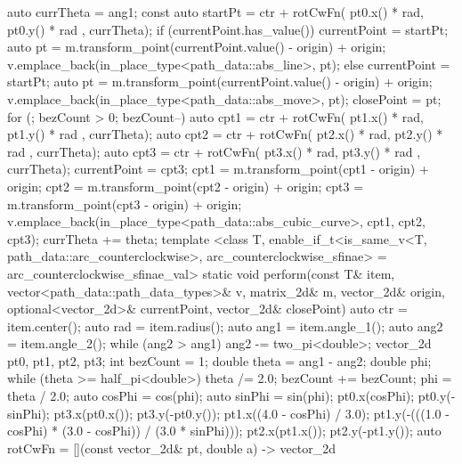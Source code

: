 \begin{codeblock}
{{{{          auto currTheta = ang1;
          const auto startPt =
            ctr + rotCwFn({ pt0.x() * rad, pt0.y() * rad }, currTheta);
          if (currentPoint.has_value()) {
            currentPoint = startPt;
            auto pt = m.transform_point(currentPoint.value() - origin) + origin;
            v.emplace_back(in_place_type<path_data::abs_line>, pt);
          }
          else {
            currentPoint = startPt;
            auto pt = m.transform_point(currentPoint.value() - origin) + origin;
            v.emplace_back(in_place_type<path_data::abs_move>, pt);
            closePoint = pt;
          }
          for (; bezCount > 0; bezCount--) {
            auto cpt1 = ctr + rotCwFn({ pt1.x() * rad, pt1.y() * rad }, 
            currTheta);
            auto cpt2 = ctr + rotCwFn({ pt2.x() * rad, pt2.y() * rad },
              currTheta);
            auto cpt3 = ctr + rotCwFn({ pt3.x() * rad, pt3.y() * rad },
              currTheta);
            currentPoint = cpt3;
            cpt1 = m.transform_point(cpt1 - origin) + origin;
            cpt2 = m.transform_point(cpt2 - origin) + origin;
            cpt3 = m.transform_point(cpt3 - origin) + origin;
            v.emplace_back(in_place_type<path_data::abs_cubic_curve>, cpt1,
              cpt2, cpt3);
            currTheta += theta;
          }
        }
      }
      template <class T, enable_if_t<is_same_v<T, 
        path_data::arc_counterclockwise>, arc_counterclockwise_sfinae> = 
        arc_counterclockwise_sfinae_val>
      static void perform(const T& item, vector<path_data::path_data_types>& v, 
        matrix_2d& m, vector_2d& origin, optional<vector_2d>& currentPoint, 
        vector_2d& closePoint) {
        {
          auto ctr = item.center();
          auto rad = item.radius();
          auto ang1 = item.angle_1();
          auto ang2 = item.angle_2();
          while (ang2 > ang1) {
            ang2 -= two_pi<double>;
          }
          vector_2d pt0, pt1, pt2, pt3;
          int bezCount = 1;
          double theta = ang1 - ang2;
          double phi{};
          while (theta >= half_pi<double>) {
            theta /= 2.0;
            bezCount += bezCount;
          }
          phi = theta / 2.0;
          auto cosPhi = cos(phi);
          auto sinPhi = sin(phi);
          pt0.x(cosPhi);
          pt0.y(-sinPhi);
          pt3.x(pt0.x());
          pt3.y(-pt0.y());
          pt1.x((4.0 - cosPhi) / 3.0);
          pt1.y(-(((1.0 - cosPhi) * (3.0 - cosPhi)) / (3.0 * sinPhi)));
          pt2.x(pt1.x());
          pt2.y(-pt1.y());
          auto rotCwFn = [](const vector_2d& pt, double a) -> vector_2d {
}}}}}
\end{codeblock}
